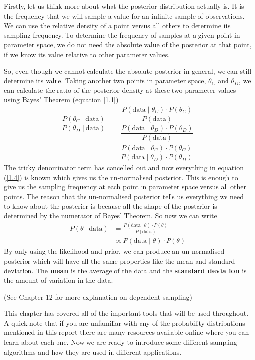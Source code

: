 \documentclass[12pt,twoside]{report}   %
\newcommand{\bb}{\textbf}
\begin{document}
Firstly, let us think more about what the posterior distribution actually is. It is the frequency that we will sample a value for an infinite sample of observations. We can use the relative density of a point versus all others to determine its sampling frequency. To determine the frequency of samples at a given point in parameter space, we do not need the absolute value of the posterior at that point, if we know its value relative to other parameter values.

So, even though we cannot calculate the absolute posterior in general, we can still determine its value. Taking another two points in parameter space, $\theta_C$ and $\theta_D$, we can calculate the ratio of the posterior density at these two parameter values using Bayes' Theorem (equation \ref{1.1})
\begin{align}
\dfrac{P(\theta_C\mid \text{data})}{P(\theta_D\mid \text{data})} &= \dfrac{\dfrac{P(\text{data}\mid\theta_C)\cdot P(\theta_C)}{P(\text{data})}}{\dfrac{P(\text{data}\mid\theta_D)\cdot P(\theta_D)}{P(\text{data})}}\nonumber \\
&= \dfrac{P(\text{data}\mid\theta_C)\cdot P(\theta_C)}{P(\text{data}\mid\theta_D)\cdot P(\theta_D)}\label{1.4}
\end{align}
The tricky denominator term has cancelled out and now everything in equation (\ref{1.4}) is known which gives us the un-normalised posterior. This is enough to give us the sampling frequency at each point in parameter space versus all other points. The reason that the un-normalised posterior tells us everything we need to know about the posterior is because all the shape of the posterior is determined by the numerator of Bayes' Theorem. So now we can write
\begin{align}
P(\theta\mid \text{data}) &= \frac{P(\text{data}\mid \theta)\cdot P(\theta)}{P(\text{data})}\nonumber \\
&\propto P(\text{data}\mid \theta)\cdot P(\theta)\label{1.5}
\end{align}
By only using the likelihood and prior, we can produce an un-normalised posterior which will have all the same properties like the mean and standard deviation. The \bb{mean} is the average of the data and the \bb{standard deviation} is the amount of variation in the data.

(See \cite{3} Chapter 12 for more explanation on dependent sampling)

This chapter has covered all of the important tools that will be used throughout. A quick note that if you are unfamiliar with any of the probability distributions mentioned in this report there are many resources available online where you can learn about each one. Now we are ready to introduce some different sampling algorithms and how they are used in different applications.
\end{document}
